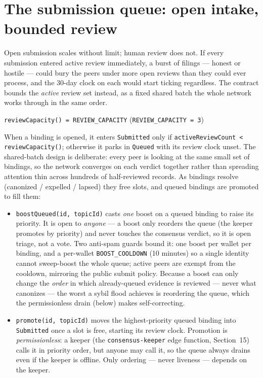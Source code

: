 \documentclass[11pt,a4paper]{article}
\begin{document}
\section{The submission queue: open intake, bounded review}

Open submission scales without limit; human review does not. If every
submission entered active review immediately, a burst of filings --- honest
or hostile --- could bury the peers under more open reviews than they could
ever process, and the 30-day clock on each would start ticking regardless.
The contract bounds the \emph{active} review set instead, as a fixed
shared batch the whole network works through in the same order.

\begin{plainbox}
\texttt{reviewCapacity() = REVIEW\_CAPACITY}
\hspace{1em}(\texttt{REVIEW\_CAPACITY = 3})
\end{plainbox}

When a binding is opened, it enters \texttt{Submitted} only if
\texttt{activeReviewCount < reviewCapacity()}; otherwise it parks in
\texttt{Queued} with its review clock unset. The shared-batch design is
deliberate: every peer is looking at the same small set of bindings, so
the network converges on each verdict together rather than spreading
attention thin across hundreds of half-reviewed records. As bindings
resolve (canonized / expelled / lapsed) they free slots, and queued
bindings are promoted to fill them:

\begin{itemize}[leftmargin=1.4em]
  \item \texttt{boostQueued(id, topicId)} casts \emph{one} boost on a queued
  binding to raise its priority. It is open to \emph{anyone} --- a boost only
  reorders the queue (the keeper promotes by priority) and never touches the
  consensus verdict, so it is open triage, not a vote. Two anti-spam guards
  bound it: one boost per wallet per binding, and a per-wallet
  \texttt{BOOST\_COOLDOWN} (10 minutes) so a single identity cannot sweep-boost
  the whole queue; active peers are exempt from the cooldown, mirroring the
  public submit policy. Because a boost can only change the \emph{order} in
  which already-queued evidence is reviewed --- never what canonizes --- the
  worst a sybil flood achieves is reordering the queue, which the permissionless
  drain (below) makes self-correcting.
  \item \texttt{promote(id, topicId)} moves the highest-priority queued
  binding into \texttt{Submitted} once a slot is free, starting its review
  clock. Promotion is \emph{permissionless}: a keeper (the
  \texttt{consensus-keeper} edge function, Section~15) calls it in priority
  order, but anyone may call it, so the queue always drains even if the
  keeper is offline. Only ordering --- never liveness --- depends on the
  keeper.
\end{itemize}
\end{document}
